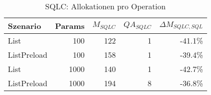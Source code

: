 
\begin{table}[ht]
\centering
\caption{SQLC: Allokationen pro Operation}
\begin{tabular}{lrrrr}
\toprule
Szenario & Params & ${M_{SQLC}}$ & ${QA_{SQLC}}$ & ${\Delta M_{SQLC,SQL}}$ \\
\midrule

	List & 100 & 122 & 1 & -41.1\% \\
	ListPreload & 100 & 158 & 1 & -39.4\% \\
	List & 1000 & 140 & 1 & -42.7\% \\
	ListPreload & 1000 & 194 & 8 & -36.8\% \\
\bottomrule
\end{tabular}
\label{tab:benchmark_sqlc_allocsperop}
\end{table}
	